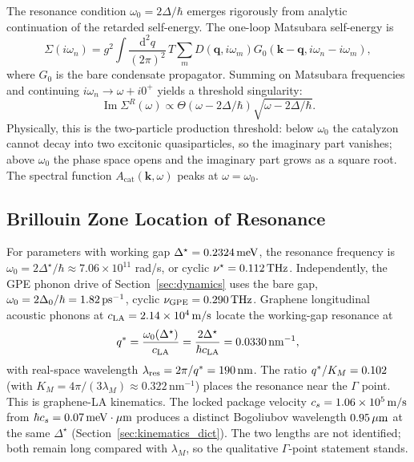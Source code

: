 \documentclass[11pt,letterpaper]{article}
\begin{document}
The resonance condition $\omega_0 = 2\Delta/\hbar$ emerges rigorously from analytic continuation of the retarded self-energy. The one-loop Matsubara self-energy is
\begin{equation}
\Sigma(i\omega_n) = g^2 \int \frac{\mathrm{d}^2 q}{(2\pi)^2} \, T \sum_m D(\mathbf{q}, i\omega_m) G_0(\mathbf{k}-\mathbf{q}, i\omega_n - i\omega_m),
\end{equation}
where $G_0$ is the bare condensate propagator. Summing on Matsubara frequencies and continuing $i\omega_n \to \omega + i0^+$ yields a threshold singularity:
\begin{equation}
\operatorname{Im} \Sigma^R(\omega) \propto \Theta(\omega - 2\Delta/\hbar) \sqrt{\omega - 2\Delta/\hbar}.
\end{equation}
Physically, this is the two-particle production threshold: below $\omega_0$ the catalyzon cannot decay into two excitonic quasiparticles, so the imaginary part vanishes; above $\omega_0$ the phase space opens and the imaginary part grows as a square root. The spectral function $A_{\text{cat}}(\mathbf{k},\omega)$ peaks at $\omega = \omega_0$.

\subsection{Brillouin Zone Location of Resonance}

For \MATBG{} parameters with working gap $\Delta^\star=0.2324\,\mathrm{meV}$, the resonance frequency is $\omega_0 = 2 \Delta^\star/\hbar \approx 7.06 \times 10^{11}$ rad/s, or cyclic $\nu^\star =0.112\,\mathrm{THz}$. Independently, the GPE phonon drive of Section~\ref{sec:dynamics} uses the bare gap, $\omega_0=2\Delta_0/\hbar=1.82\,\mathrm{ps}^{-1}$, cyclic $\nu_{\mathrm{GPE}}=0.290\,\mathrm{THz}$. Graphene longitudinal acoustic phonons at $c_{\mathrm{LA}}=2.14\times 10^{4}\,\mathrm{m/s}$ locate the working-gap resonance at
\begin{equation}
q^* = \frac{\omega_0(\Delta^\star)}{c_{\text{LA}}} = \frac{2\Delta^\star}{\hbar c_{\text{LA}}} =0.0330\,\mathrm{nm}^{-1},
\end{equation}
with real-space wavelength $\lambda_{\mathrm{res}} = 2\pi/q^* =190\,\mathrm{nm}$. The ratio $q^*/K_M =0.102$ (with $K_M=4\pi/(3\lambda_M)\approx 0.322$\,nm$^{-1}$) places the resonance near the $\Gamma$ point. This is graphene-LA kinematics. The locked package velocity $c_s=1.06\times 10^{5}\,\mathrm{m/s}$ from $\hbar c_s=0.07\,\mathrm{meV\cdot\mu m}$ produces a distinct Bogoliubov wavelength $0.95\,\mu\mathrm{m}$ at the same $\Delta^\star$ (Section~\ref{sec:kinematics_dict}). The two lengths are not identified; both remain long compared with $\lambda_M$, so the qualitative $\Gamma$-point statement stands.
\end{document}
